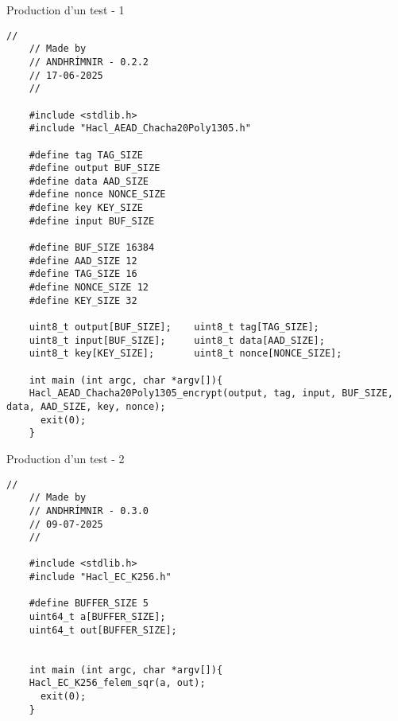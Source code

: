 \documentclass[A4,svgnames,9pt,aspectratio=169]{beamer}
\begin{document}
\begin{frame}[fragile]{Production d'un test - 1}
  \begin{lstlisting}[style=CStyle, basicstyle=\tiny\ttfamily, gobble=4, caption={Hacl\_AEAD\_Chacha20Poly1305\_encrypt.c}]
    //
    // Made by
    // ANDHRÍMNIR - 0.2.2
    // 17-06-2025
    //

    #include <stdlib.h>
    #include "Hacl_AEAD_Chacha20Poly1305.h"

    #define tag TAG_SIZE
    #define output BUF_SIZE
    #define data AAD_SIZE
    #define nonce NONCE_SIZE
    #define key KEY_SIZE
    #define input BUF_SIZE

    #define BUF_SIZE 16384
    #define AAD_SIZE 12
    #define TAG_SIZE 16
    #define NONCE_SIZE 12
    #define KEY_SIZE 32

    uint8_t output[BUF_SIZE];    uint8_t tag[TAG_SIZE];
    uint8_t input[BUF_SIZE];     uint8_t data[AAD_SIZE];
    uint8_t key[KEY_SIZE];       uint8_t nonce[NONCE_SIZE];

    int main (int argc, char *argv[]){
    Hacl_AEAD_Chacha20Poly1305_encrypt(output, tag, input, BUF_SIZE, data, AAD_SIZE, key, nonce);
      exit(0);
    }
  \end{lstlisting}

\end{frame}


\begin{frame}[fragile]{Production d'un test - 2}
  \begin{lstlisting}[style=CStyle, gobble=4, caption={Hacl\_EC\_K256\_felem\_sqr.c}]
    //
    // Made by
    // ANDHRÍMNIR - 0.3.0
    // 09-07-2025
    //

    #include <stdlib.h>
    #include "Hacl_EC_K256.h"

    #define BUFFER_SIZE 5
    uint64_t a[BUFFER_SIZE];
    uint64_t out[BUFFER_SIZE];


    int main (int argc, char *argv[]){
    Hacl_EC_K256_felem_sqr(a, out);
      exit(0);
    }
  \end{lstlisting}
\end{frame}
\end{document}
